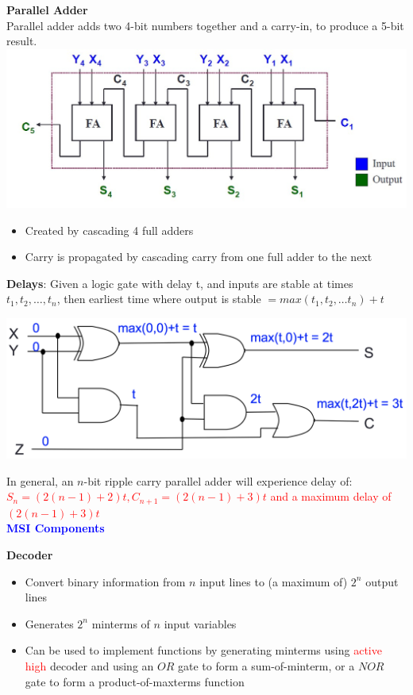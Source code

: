 \documentclass[a4paper]{article} \usepackage[backend=biber, style=numeric, sorting=none]{biblatex}
\newenvironment{Figure}
  {\par\medskip\noindent\minipage{\linewidth}}
  {\endminipage\par\medskip}
\begin{document}
\begin{multicols*}{4}
\textbf{Parallel Adder}\\
Parallel adder adds two 4-bit numbers together and a carry-in, to produce a 5-bit result.\\

\includegraphics[scale=0.3]{parallel_adder.jpg}

\begin{itemize}
    \item Created by cascading 4 full adders
    \item Carry is propagated by cascading carry from one full adder to the next
\end{itemize}

\columnbreak
\textbf {Delays}: Given a logic gate with delay t, and inputs are stable at times $t_1, t_2, \dots,t_n$, then earliest time where output is stable $ = max(t_1, t_2, \dots t_n) + t$

\begin{Figure}
 \centering
 \includegraphics[scale=0.18]{circuit_delay.png}
\end{Figure}

In general, an $n$-bit ripple carry parallel adder will experience delay of: \textcolor{red}{$S_n = (2(n-1)+2)t, C_{n+1}=(2(n-1)+3)t$ and a maximum delay of $(2(n-1)+3)t$}\\

{\small\textbf{\textcolor{blue}{MSI Components}}}
\begin{multicols*}{2}
\textbf{{Decoder}}
\begin{itemize}
    \item Convert binary information from $n$ input lines to (a maximum of) $2^n$ output lines
    \item Generates $2^n$ minterms of $n$ input variables
    \item Can be used to implement functions by generating minterms using \textcolor{red}{active high} decoder and using an $OR$ gate to form a sum-of-minterm, or a $NOR$ gate to form a product-of-maxterms function
\end{itemize}
\columnbreak


\end{multicols*}
\end{multicols*}
\end{document}
